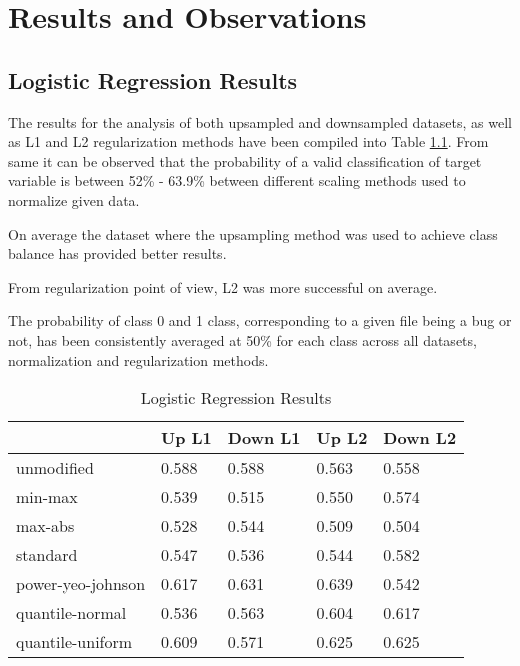 \chapter{Results and Observations}\label{chp:results-and-observations}
\section{Logistic Regression Results}\label{sec:results:log-reg}

The results for the analysis of both upsampled and downsampled datasets, as well as L1 and L2 regularization methods have been compiled into Table \ref{tbl:results:log-reg}. From same it can be observed that the probability of a valid classification of \isBug{} target variable is between 52\% - 63.9\% between different scaling methods used to normalize given data.

On average the dataset where the upsampling method was used to achieve class balance has provided better results. 

From regularization point of view, L2 was more successful on average.

The probability of class 0 and 1 class, corresponding to a given file being a bug or not, has been consistently averaged at 50\% for each class across all datasets, normalization and regularization methods. 
\begin{table}[h!]
\centering
\caption{Logistic Regression Results}
\label{tbl:results:log-reg}
\begin{tabular}{@{}lllll@{}}
\toprule
 & Up L1 & Down L1 & Up L2 & Down L2 \\ \midrule
unmodified & 0.588 & 0.588 & 0.563 & 0.558 \\
min-max & 0.539 & 0.515 & 0.550 & 0.574 \\
max-abs & 0.528 & 0.544 & 0.509 & 0.504 \\
standard & 0.547 & 0.536 & 0.544 & 0.582 \\
power-yeo-johnson & 0.617 & 0.631 & 0.639 & 0.542 \\
quantile-normal & 0.536 & 0.563 & 0.604 & 0.617 \\
quantile-uniform & 0.609 & 0.571 & 0.625 & 0.625 \\ \bottomrule
\end{tabular}
\end{table}

